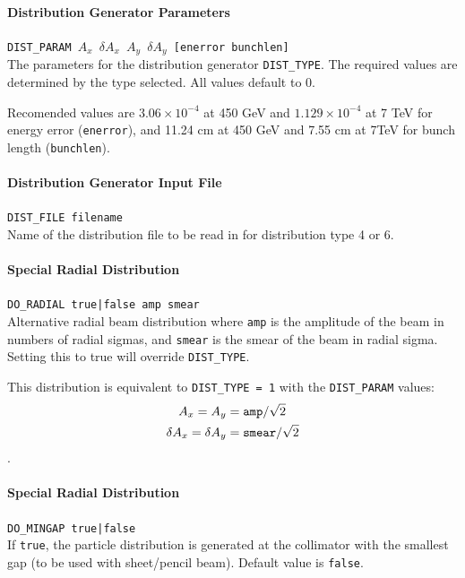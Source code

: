 \paragraph{Distribution Generator Parameters} \texttt{DIST\_PARAM $A_x$ $\delta A_x$ $A_y$ $\delta A_y$ [enerror bunchlen]}\\

The parameters for the distribution generator \texttt{DIST\_TYPE}.
The required values are determined by the type selected.
All values default to 0.

Recomended values are $3.06 \times 10^{-4}$ at 450 GeV and $1.129 \times 10^{-4}$ at 7 TeV for energy error (\texttt{enerror}), and 11.24 cm at 450 GeV and 7.55 cm at 7TeV for bunch length (\texttt{bunchlen}).

\paragraph{Distribution Generator Input File} \texttt{DIST\_FILE filename}\\

Name of the distribution file to be read in for distribution type 4 or 6.

\paragraph{Special Radial Distribution} \texttt{DO\_RADIAL true|false amp smear}\\

Alternative radial beam distribution where \texttt{amp} is the amplitude of the beam in numbers of radial sigmas, and \texttt{smear} is the smear of the beam in radial sigma.
Setting this to true will override \texttt{DIST\_TYPE}.

This distribution is equivalent to \texttt{DIST\_TYPE = 1} with the \texttt{DIST\_PARAM} values:
\begin{align*}
   A_x = A_y &= \mbox{\texttt{amp}}/\sqrt{2}\\
   \delta A_x = \delta A_y &= \mbox{\texttt{smear}}/\sqrt{2}
\end{align*}.

\paragraph{Special Radial Distribution} \texttt{DO\_MINGAP true|false}\\

If \texttt{true}, the particle distribution is generated at the collimator with the smallest gap (to be used with sheet/pencil beam).
Default value is \texttt{false}.

